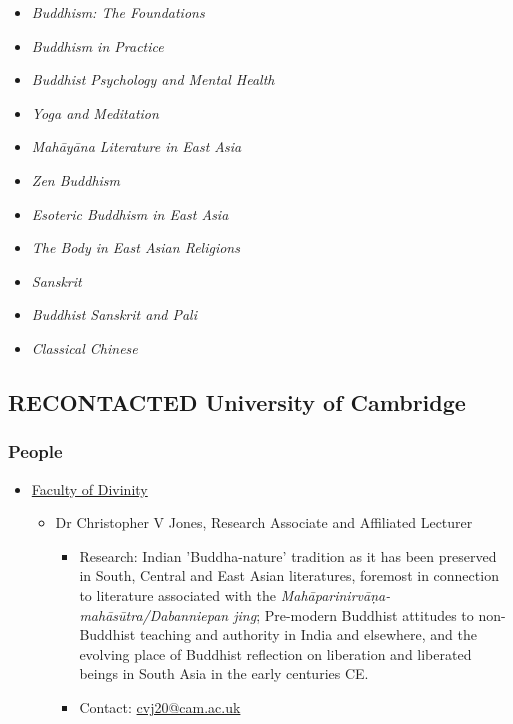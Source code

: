 \documentclass[11pt]{article}
\begin{document}
\begin{itemize}
\label{sec:org259a173}
\begin{itemize}
\item \emph{Buddhism: The Foundations}\\
\item \emph{Buddhism in Practice}\\
\item \emph{Buddhist Psychology and Mental Health}\\
\item \emph{Yoga and Meditation}\\
\item \emph{Mahāyāna Literature in East Asia}\\
\item \emph{Zen Buddhism}\\
\item \emph{Esoteric Buddhism in East Asia}\\
\item \emph{The Body in East Asian Religions}\\
\item \emph{Sanskrit}\\
\item \emph{Buddhist Sanskrit and Pali}\\
\item \emph{Classical Chinese}\\
\end{itemize}
\end{itemize}

\subsection*{{\bfseries\sffamily RECONTACTED} University of Cambridge}
\label{sec:org77a86e1}
\subsubsection*{People}
\label{sec:orgb71ad64}
\begin{itemize}
\item \href{https://www.divinity.cam.ac.uk/}{Faculty of Divinity}
\label{sec:org7b5f383}
\begin{itemize}
\item Dr Christopher V Jones, Research Associate and Affiliated Lecturer
\label{sec:orgd6513c4}
\begin{itemize}
\item Research: Indian 'Buddha-nature' tradition as it has been preserved in South, Central and East Asian literatures, foremost in connection to literature associated with the \emph{Mahāparinirvāṇa-mahāsūtra/Dabanniepan jing}; Pre-modern Buddhist attitudes to non-Buddhist teaching and authority in India and elsewhere, and the evolving place of Buddhist reflection on liberation and liberated beings in South Asia in the early centuries CE.\\
\item Contact: \href{mailto:cvj20@cam.ac.uk}{cvj20@cam.ac.uk}\\
\end{itemize}
\end{itemize}
\end{itemize}
\end{document}
